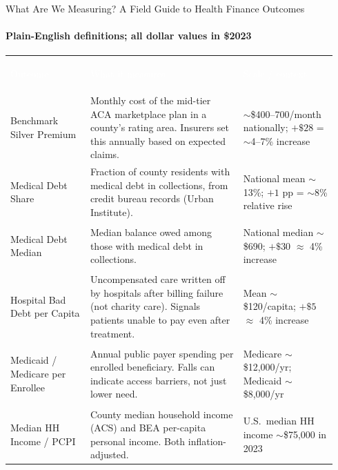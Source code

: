 \documentclass[aspectratio=169,11pt]{beamer}
\begin{document}
\begin{frame}[shrink=25]{What Are We Measuring? A Field Guide to Health Finance Outcomes}
  \framesubtitle{Plain-English definitions; all dollar values in \$2023}
  \footnotesize
  \renewcommand{\arraystretch}{1.55}
  \begin{tabular}{@{}>{\bfseries\color{DeepNavy}\raggedright\arraybackslash}p{0.23\linewidth}%
                     >{\raggedright\arraybackslash}p{0.44\linewidth}%
                     >{\raggedright\arraybackslash}p{0.27\linewidth}@{}}
    \rowcolor{DeepNavy}
    \textcolor{white}{Outcome} & \textcolor{white}{What it measures} & \textcolor{white}{Scale / context} \\
    \rowcolor{Teal!10}
    Benchmark Silver Premium &
      Monthly cost of the mid-tier ACA marketplace plan in a county's rating area. Insurers set this annually based on expected claims. &
      $\sim$\$400--700/month nationally; $+\$28$ = $\sim$4--7\% increase \\
    Medical Debt Share &
      Fraction of county residents with medical debt in collections, from credit bureau records (Urban Institute). &
      National mean $\sim$13\%; $+1$ pp = $\sim$8\% relative rise \\
    \rowcolor{Teal!10}
    Medical Debt Median &
      Median balance owed among those with medical debt in collections. &
      National median $\sim$\$690; $+\$30$ $\approx$ 4\% increase \\
    Hospital Bad Debt per Capita &
      Uncompensated care written off by hospitals after billing failure (not charity care). Signals patients unable to pay even after treatment. &
      Mean $\sim$\$120/capita; $+\$5$ $\approx$ 4\% increase \\
    \rowcolor{Teal!10}
    Medicaid / Medicare per Enrollee &
      Annual public payer spending per enrolled beneficiary. Falls can indicate access barriers, not just lower need. &
      Medicare $\sim$\$12,000/yr; Medicaid $\sim$\$8,000/yr \\
    Median HH Income / PCPI &
      County median household income (ACS) and BEA per-capita personal income. Both inflation-adjusted. &
      U.S.\ median HH income $\sim$\$75,000 in 2023 \\
  \end{tabular}
\end{frame}
\end{document}
